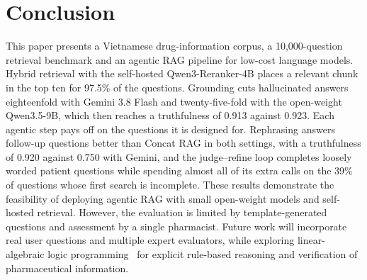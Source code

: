 \section{Conclusion}\label{sec:conclusion}

This paper presents a Vietnamese drug-information corpus, a 10{,}000-question retrieval benchmark and an agentic RAG pipeline for low-cost language models. Hybrid retrieval with the self-hosted Qwen3-Reranker-4B places a relevant chunk in the top ten for 97.5\% of the questions. Grounding cuts hallucinated answers eighteenfold with Gemini 3.8 Flash and twenty-five-fold with the open-weight Qwen3.5-9B, which then reaches a truthfulness of 0.913 against 0.923. Each agentic step pays off on the questions it is designed for. Rephrasing answers follow-up questions better than Concat RAG in both settings, with a truthfulness of 0.920 against 0.750 with Gemini, and the judge--refine loop completes loosely worded patient questions while spending almost all of its extra calls on the 39\% of questions whose first search is incomplete. These results demonstrate the feasibility of deploying agentic RAG with small open-weight models and self-hosted retrieval. However, the evaluation is limited by template-generated questions and assessment by a single pharmacist. Future work will incorporate real user questions and multiple expert evaluators, while exploring linear-algebraic logic programming~\cite{nguyen2022sparse,sakama2017linear} for explicit rule-based reasoning and verification of pharmaceutical information.
